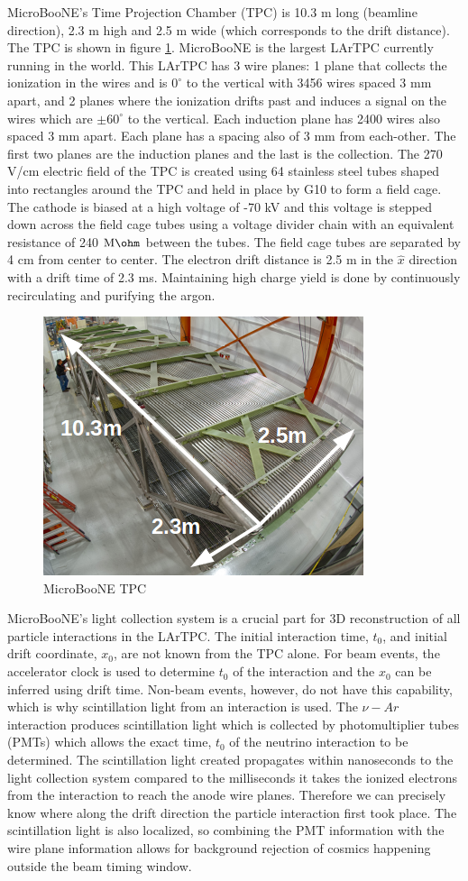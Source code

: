 MicroBooNE's Time Projection Chamber (TPC) is 10.3 m long (beamline direction), 2.3 m high and 2.5 m wide (which corresponds to the drift distance). The TPC is shown in figure \ref{fig:tpc}. MicroBooNE is the largest LArTPC currently running in the world. This LArTPC has 3 wire planes: 1 plane that collects the ionization in the wires and is $0^{\circ}$ to the vertical with 3456 wires spaced 3 mm apart, and 2 planes where the ionization drifts past and induces a signal on the wires which are $\pm 60^{\circ}$ to the vertical. Each induction plane has 2400 wires also spaced 3 mm apart. Each plane has a spacing also of 3 mm from each-other. The first two planes are the induction planes and the last is the collection. The 270 V/cm electric field of the TPC is created using 64 stainless steel tubes shaped into rectangles around the TPC and held in place by G10 to form a field cage. The cathode is biased at a high voltage of -70 kV and this voltage is stepped down across the field cage tubes using a voltage divider chain with an equivalent resistance of 240 $\text{M}\ohm$ between the tubes. The field cage tubes are separated by 4 cm from center to center. The electron drift distance is 2.5 m in the $\hat{x}$ direction with a drift time of 2.3 ms. Maintaining high charge yield is done by continuously recirculating and purifying the argon. 
\begin{figure}[htp!]
\centering
\includegraphics[width=.5\textwidth]{figs/detector1.png}
\caption{MicroBooNE TPC}
\label{fig:tpc}
\end{figure}

MicroBooNE's light collection system is a crucial part for 3D reconstruction of all particle interactions in the LArTPC. The initial interaction time, $t_0$, and initial drift coordinate, $x_0$, are not known from the TPC alone. For beam events, the accelerator clock is used to determine $t_0$ of the interaction and the $x_0$ can be inferred using drift time. Non-beam events, however, do not have this capability, which is why scintillation light from an interaction is used. The $\nu-Ar$ interaction produces scintillation light which is collected by photomultiplier tubes (PMTs) which allows the exact time, $t_0$ of the neutrino interaction to be determined. The scintillation light created propagates within nanoseconds to the light collection system compared to the milliseconds it takes the ionized electrons from the interaction to reach the anode wire planes. Therefore we can precisely know where along the drift direction the particle interaction first took place. The scintillation light is also localized, so combining the PMT information with the wire plane information allows for background rejection of cosmics happening outside the beam timing window.  



